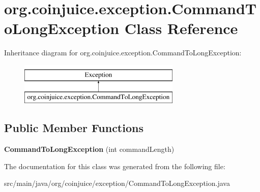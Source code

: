 \hypertarget{classorg_1_1coinjuice_1_1exception_1_1_command_to_long_exception}{\section{org.\-coinjuice.\-exception.\-Command\-To\-Long\-Exception Class Reference}
\label{classorg_1_1coinjuice_1_1exception_1_1_command_to_long_exception}
}
Inheritance diagram for org.\-coinjuice.\-exception.\-Command\-To\-Long\-Exception\-:\begin{figure}[H]
\begin{center}
\leavevmode
\includegraphics[height=2.000000cm]{classorg_1_1coinjuice_1_1exception_1_1_command_to_long_exception}
\end{center}
\end{figure}
\subsection*{Public Member Functions}
\begin{DoxyCompactItemize}
\item 
\hypertarget{classorg_1_1coinjuice_1_1exception_1_1_command_to_long_exception_a000585b394947c7e3661a84d18acf79c}{{\bfseries Command\-To\-Long\-Exception} (int command\-Length)}\label{classorg_1_1coinjuice_1_1exception_1_1_command_to_long_exception_a000585b394947c7e3661a84d18acf79c}

\end{DoxyCompactItemize}


The documentation for this class was generated from the following file\-:\begin{DoxyCompactItemize}
\item 
src/main/java/org/coinjuice/exception/Command\-To\-Long\-Exception.\-java\end{DoxyCompactItemize}
